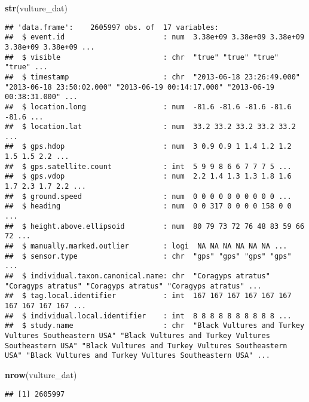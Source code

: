\documentclass[
]{article}
\newenvironment{Shaded}{\begin{snugshade}}{\end{snugshade}}
\newcommand{\FunctionTok}[1]{\textcolor[rgb]{0.13,0.29,0.53}{\textbf{#1}}}
\newcommand{\NormalTok}[1]{#1}
\begin{document}
\begin{Shaded}
\begin{Highlighting}[]
\FunctionTok{str}\NormalTok{(vulture\_dat)}
\end{Highlighting}
\end{Shaded}

\begin{verbatim}
## 'data.frame':    2605997 obs. of  17 variables:
##  $ event.id                       : num  3.38e+09 3.38e+09 3.38e+09 3.38e+09 3.38e+09 ...
##  $ visible                        : chr  "true" "true" "true" "true" ...
##  $ timestamp                      : chr  "2013-06-18 23:26:49.000" "2013-06-18 23:50:02.000" "2013-06-19 00:14:17.000" "2013-06-19 00:38:31.000" ...
##  $ location.long                  : num  -81.6 -81.6 -81.6 -81.6 -81.6 ...
##  $ location.lat                   : num  33.2 33.2 33.2 33.2 33.2 ...
##  $ gps.hdop                       : num  3 0.9 0.9 1 1.4 1.2 1.2 1.5 1.5 2.2 ...
##  $ gps.satellite.count            : int  5 9 9 8 6 6 7 7 7 5 ...
##  $ gps.vdop                       : num  2.2 1.4 1.3 1.3 1.8 1.6 1.7 2.3 1.7 2.2 ...
##  $ ground.speed                   : num  0 0 0 0 0 0 0 0 0 0 ...
##  $ heading                        : num  0 0 317 0 0 0 0 158 0 0 ...
##  $ height.above.ellipsoid         : num  80 79 73 72 76 48 83 59 66 72 ...
##  $ manually.marked.outlier        : logi  NA NA NA NA NA NA ...
##  $ sensor.type                    : chr  "gps" "gps" "gps" "gps" ...
##  $ individual.taxon.canonical.name: chr  "Coragyps atratus" "Coragyps atratus" "Coragyps atratus" "Coragyps atratus" ...
##  $ tag.local.identifier           : int  167 167 167 167 167 167 167 167 167 167 ...
##  $ individual.local.identifier    : int  8 8 8 8 8 8 8 8 8 8 ...
##  $ study.name                     : chr  "Black Vultures and Turkey Vultures Southeastern USA" "Black Vultures and Turkey Vultures Southeastern USA" "Black Vultures and Turkey Vultures Southeastern USA" "Black Vultures and Turkey Vultures Southeastern USA" ...
\end{verbatim}

\begin{Shaded}
\begin{Highlighting}[]
\FunctionTok{nrow}\NormalTok{(vulture\_dat)}
\end{Highlighting}
\end{Shaded}

\begin{verbatim}
## [1] 2605997
\end{verbatim}
\end{document}
